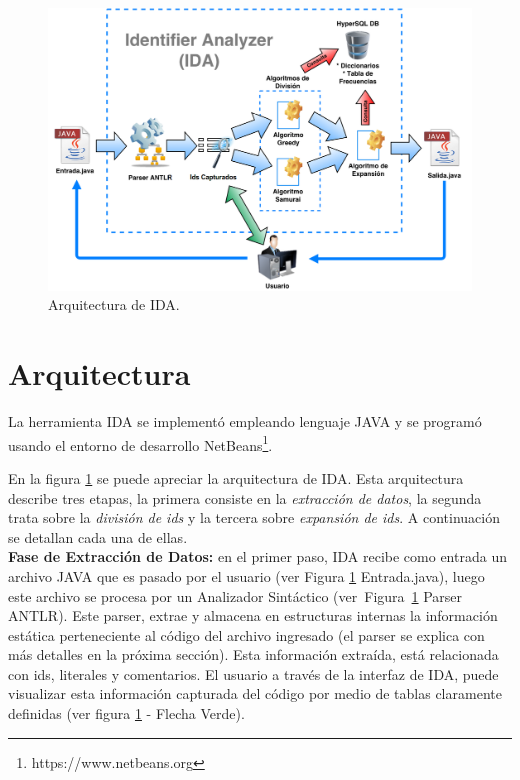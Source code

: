\pagebreak
\begin{figure}[ht] %
\centerline{%
\includegraphics[scale= 0.35]{./cap4/ida_arq.png}
}
\caption{Arquitectura de IDA.}
\label{arq1}
\end{figure}

\vspace{-2em} %

\section{Arquitectura}

La herramienta IDA se implementó empleando lenguaje JAVA y se programó usando el entorno de desarrollo NetBeans\footnote[1]{https://www.netbeans.org}. 

En la figura \ref{arq1} se puede apreciar la arquitectura de IDA. Esta arquitectura describe tres etapas, la primera consiste en la \textit{extracción de datos}, la segunda trata sobre la \textit{división de ids} y la tercera sobre \textit{expansión de ids}. A continuación se detallan cada una de ellas.\\

\textbf{Fase de Extracción de Datos:} en el primer paso, IDA recibe como entrada un archivo JAVA que es pasado por el usuario (ver Figura \ref{arq1} Entrada.java), luego este archivo se procesa por un Analizador Sintáctico (\mbox{ver Figura \ref{arq1}} Parser ANTLR). Este parser, extrae y almacena en estructuras internas la información estática perteneciente al código del archivo ingresado (el parser se explica con más detalles en la próxima sección). Esta información extraída, está relacionada con ids, literales y comentarios. El usuario a través de la interfaz de IDA, puede visualizar esta información capturada del código por medio de tablas claramente definidas (ver figura \ref{arq1} - Flecha Verde).\\ 

